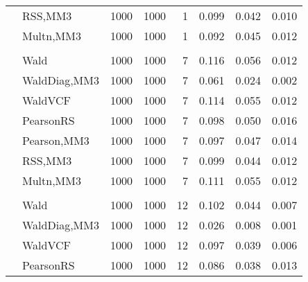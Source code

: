 \documentclass[
]{article}
\begin{document}
\begin{table}[H]
{\begin{tabular}[t]{llrrrrrr}
\hspace{1em} & RSS,MM3 & 1000 & 1000 & 1 & 0.099 & 0.042 & 0.010\\

\hspace{1em} & Multn,MM3 & 1000 & 1000 & 1 & 0.092 & 0.045 & 0.012\\
\cmidrule{1-8}
\addlinespace[0.3em]
\multicolumn{8}{l}{\textbf{1F 15V}}\\
\hspace{1em} & Wald & 1000 & 1000 & 7 & 0.116 & 0.056 & 0.012\\

\hspace{1em} & WaldDiag,MM3 & 1000 & 1000 & 7 & 0.061 & 0.024 & 0.002\\

\hspace{1em} & WaldVCF & 1000 & 1000 & 7 & 0.114 & 0.055 & 0.012\\

\hspace{1em} & PearsonRS & 1000 & 1000 & 7 & 0.098 & 0.050 & 0.016\\

\hspace{1em} & Pearson,MM3 & 1000 & 1000 & 7 & 0.097 & 0.047 & 0.014\\

\hspace{1em} & RSS,MM3 & 1000 & 1000 & 7 & 0.099 & 0.044 & 0.012\\

\hspace{1em} & Multn,MM3 & 1000 & 1000 & 7 & 0.111 & 0.055 & 0.012\\
\cmidrule{1-8}
\addlinespace[0.3em]
\multicolumn{8}{l}{\textbf{2F 10V}}\\
\hspace{1em} & Wald & 1000 & 1000 & 12 & 0.102 & 0.044 & 0.007\\

\hspace{1em} & WaldDiag,MM3 & 1000 & 1000 & 12 & 0.026 & 0.008 & 0.001\\

\hspace{1em} & WaldVCF & 1000 & 1000 & 12 & 0.097 & 0.039 & 0.006\\

\hspace{1em} & PearsonRS & 1000 & 1000 & 12 & 0.086 & 0.038 & 0.013\\


\end{tabular}}
\end{table}
\end{document}
